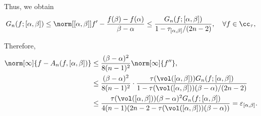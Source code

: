 \documentclass[]{elsarticle}
\DeclareMathOperator{\err}{err}
\theoremstyle{definition}
\theoremstyle{remark}
\begin{document}
Thus, we obtain
\begin{gather*}
G_n(f;[\alpha,\beta])\le \norm[{[\alpha, \beta]}]{f'-\frac{f(\beta)-f(\alpha)}{\beta-\alpha}} \le \frac{G_n(f;[\alpha,\beta])}{1-\tau_{[\alpha,\beta]}/(2n-2)}, \quad \forall f \in \cc_{\tau},
\end{gather*}

Therefore,
\begin{align*}
\norm[\infty]{f-A_{n}(f,[\alpha,\beta])}
& \le \frac{(\beta-\alpha)^2}{8(n-1)^2}\norm[\infty]{f''}, \\
& \le \frac{(\beta-\alpha)^2}{8(n-1)^2}\cdot\frac{\tau(\vol([\alpha,\beta]))G_n(f;[\alpha,\beta])}{1-\tau(\vol([\alpha,\beta]))(\beta-\alpha)/(2n-2)} \\
& \le \frac{\tau(\vol([\alpha,\beta]))(\beta-\alpha)^2 G_n(f;[\alpha,\beta])}{4(n-1)(2n-2-\tau(\vol([\alpha,\beta]))(\beta-\alpha))}=\varepsilon_{[\alpha,\beta]}.
\end{align*}

\end{document}
